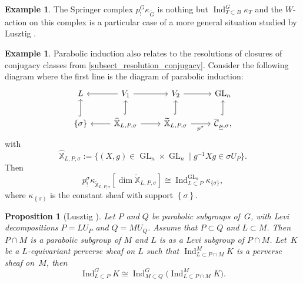 \documentclass[11pt]{article}
\theoremstyle{definition}
\newtheorem{example}[definition]{Example}
\theoremstyle{plain}
\newtheorem{proposition}[definition]{Proposition}
\DeclareMathOperator{\Ind}{Ind}
\DeclareMathOperator{\GL}{GL}
\newcommand{\inv}{^{-1}}
\begin{document}
\begin{example}
The Springer complex $p^G_! \kappa_{\widetilde{G}}$ is nothing but $\Ind_{T\subset B}^G \kappa_T$ and the $W$-action on this complex is a particular case of a more general situation studied by Lusztig \cite{Lusztig1986}.
\end{example}
\begin{example}\label{example_induction_resolution}
Parabolic induction also relates to the resolutions of closures of conjugacy classes from \ref{subsect_resolution_conjugacy}.
Consider the following diagram where the first line is the diagram of parabolic induction:
\begin{equation*}
\begin{tikzcd}
L & \arrow[l,swap] V_1 \arrow[r] & V_2 \arrow[r] & \GL_n \\
\left\lbrace \sigma\right\rbrace \arrow[u,hookrightarrow] &\arrow[l]\arrow[r] \arrow[u,hookrightarrow] \widehat{\mathbb{X}}_{L,P, \sigma} & \arrow[r,swap,"p^{\sigma}"] \arrow[u,hookrightarrow] \mathbb{\widetilde{X}}_{L,P, \sigma} &\arrow[u,hookrightarrow] \overline{\mathcal{C}}_{\underline{\mu},\sigma},
\end{tikzcd}
\end{equation*}
with
\[
\mathbb{\widehat{X}}_{L,P,\sigma} :=\lbrace (X, g) \in \GL_n \times \GL_n \mid g\inv X g \in \sigma U_P\rbrace.
\]
Then
\[
p_!^{\sigma} \kappa_{\mathbb{\widetilde{X}}_{L,P,\sigma}}[\dim \mathbb{\widetilde{X}}_{L,P,\sigma}] \cong \Ind_{L\subset P}^{\GL_n}\kappa_{\lbrace\sigma\rbrace},
\]
where $\kappa_{\left\lbrace\sigma\right)}$ is the constant sheaf with support $\left\lbrace \sigma\right\rbrace$.
\end{example}

\begin{proposition}[Lusztig {\cite[I-4.2]{lusztig_character_sheaves}}]\label{prop_trans_ind}
Let $P$ and $Q$ be parabolic subgroups of~$G$, with Levi decompositions $P=L U_P$ and $Q=M U_Q$. Assume that $P\subset Q$ and $L\subset M$. Then $P\cap M$ is a parabolic subgroup of $M$ and $L$ is as a Levi subgroup of $P\cap M$. Let~$K$ be a $L$-equivariant perverse sheaf on $L$ such that $\Ind_{L\subset P\cap M}^{M} K$ is a perverse sheaf on~$M$, then
\begin{equation*}
\Ind_{L\subset P}^{G} K\cong \Ind_{M\subset Q}^{G}\bigl(\Ind_{L\subset P\cap M}^{M} K\bigr).
\end{equation*}
\end{proposition}
\end{document}
